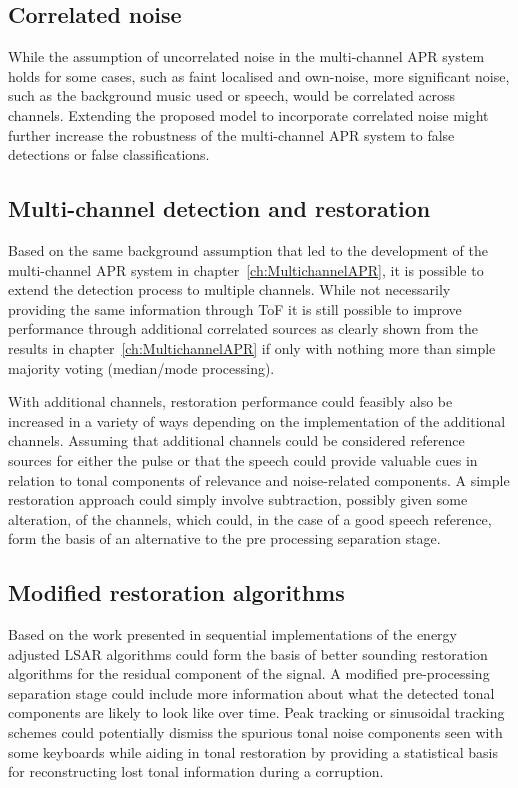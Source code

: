 \subsection{Correlated noise}
While the assumption of uncorrelated noise in the multi-channel APR system holds for some cases, such as faint localised and own-noise, more significant noise, such as the background music used or speech, would be correlated across channels. Extending the proposed model to incorporate correlated noise might further increase the robustness of the multi-channel APR system to false detections or false classifications.

\subsection{Multi-channel detection and restoration}
Based on the same background assumption that led to the development of the multi-channel APR system in chapter~\ref{ch:MultichannelAPR}, it is possible to extend the detection process to multiple channels. While not necessarily providing the same information through ToF it is still possible to improve performance through additional correlated sources as clearly shown from the results in chapter~\ref{ch:MultichannelAPR} if only with nothing more than simple majority voting (median/mode processing).

With additional channels, restoration performance could feasibly also be increased in a variety of ways depending on the implementation of the additional channels. Assuming that additional channels could be considered reference sources for either the pulse or that the speech could provide valuable cues in relation to tonal components of relevance and noise-related components. A simple restoration approach could simply involve subtraction, possibly given some alteration, of the channels, which could, in the case of a good speech reference, form the basis of an alternative to the pre processing separation stage.

\subsection{Modified restoration algorithms}
Based on the work presented in \cite{Esquef2006} sequential implementations of the energy adjusted LSAR algorithms could form the basis of better sounding restoration algorithms for the residual component of the signal. A modified pre-processing separation stage could include more information about what the detected tonal components are likely to look like over time. Peak tracking or sinusoidal tracking schemes\cite{McAulay1986} could potentially dismiss the spurious tonal noise components seen with some keyboards while aiding in tonal restoration by providing a statistical basis for reconstructing lost tonal information during a corruption.

